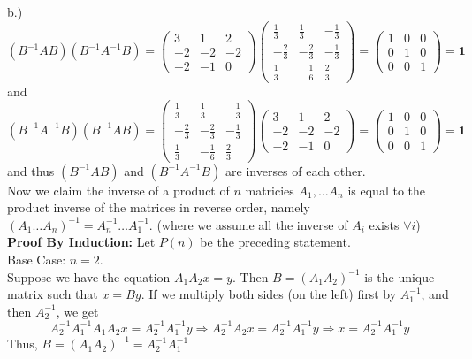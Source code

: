 \documentclass[12pt]{article}
\begin{document}
b.) $(B^{-1}AB)(B^{-1}A^{-1}B) = \begin{pmatrix} 3 & 1 & 2 \\ -2 & -2 & -2 \\ -2 & -1 & 0\end{pmatrix} \begin{pmatrix} \frac{1}{3} & \frac{1}{3} & -\frac{1}{3} \\ -\frac{2}{3} & -\frac{2}{3} & -\frac{1}{3} \\ \frac{1}{3} & -\frac{1}{6} & \frac{2}{3}\end{pmatrix} = \begin{pmatrix} 1 & 0 & 0 \\ 0 & 1 & 0 \\ 0 & 0 & 1 \end{pmatrix} = \textbf{1}$ and $(B^{-1}A^{-1}B)(B^{-1}AB) = \begin{pmatrix} \frac{1}{3} & \frac{1}{3} & -\frac{1}{3} \\ -\frac{2}{3} & -\frac{2}{3} & -\frac{1}{3} \\ \frac{1}{3} & -\frac{1}{6} & \frac{2}{3}\end{pmatrix}  \begin{pmatrix} 3 & 1 & 2 \\ -2 & -2 & -2 \\ -2 & -1 & 0\end{pmatrix} = \begin{pmatrix} 1 & 0 & 0 \\ 0 & 1 & 0 \\ 0 & 0 & 1 \end{pmatrix} = \textbf{1}$ and thus $(B^{-1}AB)$ and $(B^{-1}A^{-1}B)$ are inverses of each other.\\

Now we claim the inverse of a product of $n$ matricies $A_1, \dots A_n$ is equal to the product inverse of the matrices in reverse order, namely $(A_1 \dots A_n)^{-1} = A_n^{-1} \dots A_1^{-1}$. (where we assume all the inverse of $A_i$ exists $\forall i$)\\

\textbf{Proof By Induction: }Let $P(n)$ be the preceding statement.\\
Base Case: $n = 2$.\\
Suppose we have the equation $A_1 A_2 x = y$. Then $B = (A_1 A_2)^{-1}$ is the unique matrix such that $x = By$. If we multiply both sides (on the left) first by $A_1^{-1}$, and then $A_2^{-1}$, we get
$$A_2^{-1} A_1^{-1} A_1 A_2 x = A_2^{-1} A_1^{-1} y \Rightarrow A_2^{-1} A_2 x = A_2^{-1} A_1^{-1} y \Rightarrow x= A_2^{-1} A_1^{-1} y$$
Thus, $B = (A_1 A_2)^{-1} = A_2^{-1} A_1^{-1}$\\
\end{document}
